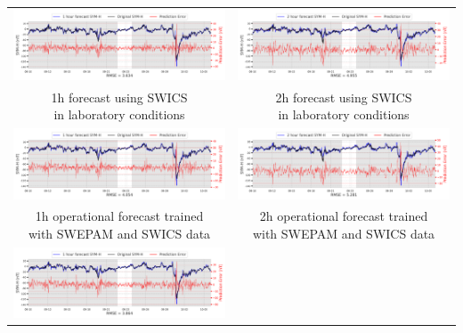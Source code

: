 \documentclass[draft,sw]{agutexSI2019}
\begin{document}
\begin{table}
\centering
\begin{tabular}{cc}
\includegraphics[width=0.49\linewidth]{paper_plots_shade/1h_swics/1h_swics_storm_38.png}
&
\includegraphics[width=0.49\linewidth]{paper_plots_shade/2h_swics/2h_swics_storm_38.png}
\\
\shortstack{1h forecast using SWICS\\ in laboratory conditions} & \shortstack{2h forecast using SWICS\\ in laboratory conditions}
\vspace*{12pt}
\\
\includegraphics[width=0.49\linewidth]{paper_plots_shade/1h_swics_rt/1h_swics_rt_storm_38.png}
&
\includegraphics[width=0.49\linewidth]{paper_plots_shade/2h_swics_rt/2h_swics_rt_storm_38.png}
\\
\shortstack{1h operational forecast trained\\ with SWEPAM and SWICS data} & \shortstack{2h operational forecast trained\\ with SWEPAM and SWICS data}
\vspace*{12pt}
\\
\includegraphics[width=0.49\linewidth]{paper_plots_shade/1h_swepam_rt/1h_swepam_rt_storm_38.png}

\end{tabular}
\end{table}
\end{document}
